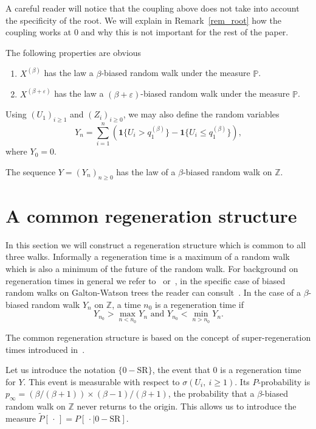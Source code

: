 \documentclass[12pt]{amsart}
\numberwithin{equation}{section}
\begin{document}
A careful reader will notice that the coupling above does not take into account  the specificity of the root. We will explain in Remark~\ref{rem_root} how the coupling works at 0 and why this is not important for the rest of the paper.

The following properties are obvious
\begin{enumerate}
\item $X^{(\beta)}$ has the law a $\beta$-biased random walk under the measure ${\mathbb{P}}$.
\item $X^{(\beta+{\varepsilon})}$ has the law a $(\beta+{\varepsilon})$-biased random walk under the measure ${\mathbb{P}}$.
\end{enumerate}

Using $(U_1)_{i\geq 1}$ and $(Z_i)_{i \geq 0}$, we may also define the random variables
\[
Y_n=\sum_{i=1}^{n} ({{\mathbf 1}{\{{U_i> q_1^{(\beta)}}\}}}-{{\mathbf 1}{\{{U_i\leq q_1^{(\beta)}}\}}}),
\]
where $Y_0=0$.

The sequence $Y=(Y_n)_{n\geq 0}$ has the law of a $\beta$-biased random walk on ${\mathbb{Z}}$.

\section{A common regeneration structure}

In this section we will construct a regeneration structure which is common to all three walks. Informally a regeneration time is a maximum of a random walk which is also a minimum of the future of the random walk. For background on regeneration times  in general we refer to~\cite{SZ} or~\cite{Zeitouni}, in the specific case of biased random walks on Galton-Watson trees the reader can consult~\cite{LPP}.   In the case of a $\beta$-biased random walk $Y_n$ on ${\mathbb{Z}}$, a time $n_0$ is a regeneration time if
\[
Y_{n_0} > \max_{n<n_0} Y_n \text{ and } Y_{n_0}< \min_{n>n_0} Y_n.
\]

The common regeneration structure is based on  the concept of super-regeneration times introduced in~\cite{FG}.

Let us introduce the notation $\{0-\text{SR}\}$, the event that $0$ is a regeneration time for $Y$. This event is measurable with respect to $\sigma(U_i,~i\geq 1)$. Its $P$-probability is $p_{\infty}=(\beta/(\beta+1))\times (\beta-1)/(\beta+1)$, the probability that a $\beta$-biased random walk on ${\mathbb{Z}}$ never returns to the origin. This allows us to introduce the measure $\tilde{P}[\,\cdot\,]=P[\,\cdot \mid 0-\text{SR}]$. 
\end{document}

